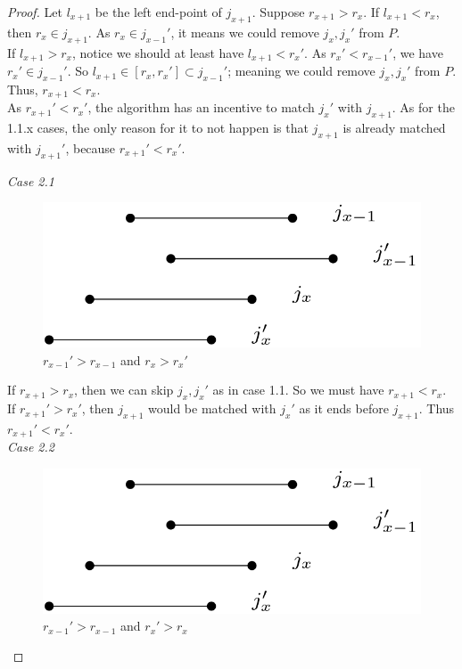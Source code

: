 \documentclass[12pt]{article}
\begin{document}
\begin{proof}
    Let $l_{x+1}$ be the left end-point of $j_{x+1}$. Suppose $r_{x+1} > r_x$. If $l_{x+1} < r_x$, then $r_x \in j_{x+1}$. As $r_x \in j_{x-1}'$, it means we could remove $j_x, j_x'$ from $P$. \\
    If $l_{x+1} > r_x$, notice we should at least have $l_{x+1} < r_x'$. As $r_x' < r_{x-1}'$, we have $r_x' \in j_{x-1}'$. So $l_{x+1} \in [r_x, r_x'] \subset j_{x-1}'$; meaning we could remove $j_x, j_x'$ from $P$. Thus, $r_{x+1} < r_x$. \\
    As $r_{x+1}'<r_x'$, the algorithm has an incentive to match $j_x'$ with $j_{x+1}$. As for the 1.1.x cases, the only reason for it to not happen is that $j_{x+1}$ is already matched with $j_{x+1}'$, because $r_{x+1}' < r_x'$.

    \vspace{\baselineskip}

    \textit{Case 2.1}
    \begin{figure}[H]
        \centering
        \includegraphics[scale= 0.3]{induction_case_2.1.png}
        \caption{$r_{x-1}' > r_{x-1}$ and $r_x > r_x'$}
    \end{figure}

    If $r_{x+1} > r_x$, then we can skip $j_x, j_x'$ as in case 1.1. So we must have $r_{x+1}<r_x$.  \\
    If $r_{x+1}' > r_x'$, then $j_{x+1}$ would be matched with $j_x'$ as it ends before $j_{x+1}$. Thus $r_{x+1}' < r_x'$. \\

    \textit{Case 2.2}
    \begin{figure}[H]
        \centering
        \includegraphics[scale= 0.3]{induction_case_2.2.png}
        \caption{$r_{x-1}' > r_{x-1}$ and $r_x' > r_x$}
    \end{figure}


\end{proof}
\end{document}
